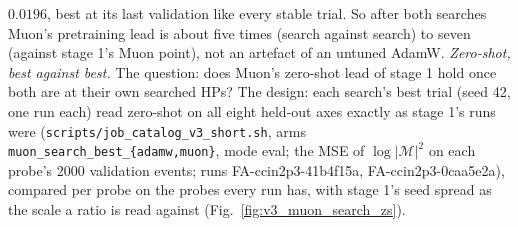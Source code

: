 \documentclass[11pt]{article}
\newcommand{\code}[1]{\texttt{#1}}
\begin{document}
\begin{itemize}
    $0.0196$, best at its last validation like every stable trial. So after both searches Muon's pretraining lead is
    about five times (search against search) to seven (against stage 1's Muon point), not an artefact of an untuned
    AdamW.
    \emph{Zero-shot, best against best.} The question: does Muon's zero-shot lead of stage 1 hold once both are at
    their own searched HPs? The design: each search's best trial (seed 42, one run each) read zero-shot on all eight
    held-out axes exactly as stage 1's runs were (\code{scripts/job\_catalog\_v3\_short.sh}, arms
    \code{muon\_search\_best\_\{adamw,muon\}}, mode eval; the MSE of $\log|\mathcal M|^2$ on each probe's $2000$
    validation events; runs FA-ccin2p3-41b4f15a, FA-ccin2p3-0caa5e2a), compared per probe on the probes every run has,
    with stage 1's seed spread as the scale a ratio is read against (Fig.~\ref{fig:v3_muon_search_zs}).

\end{itemize}
\end{document}
